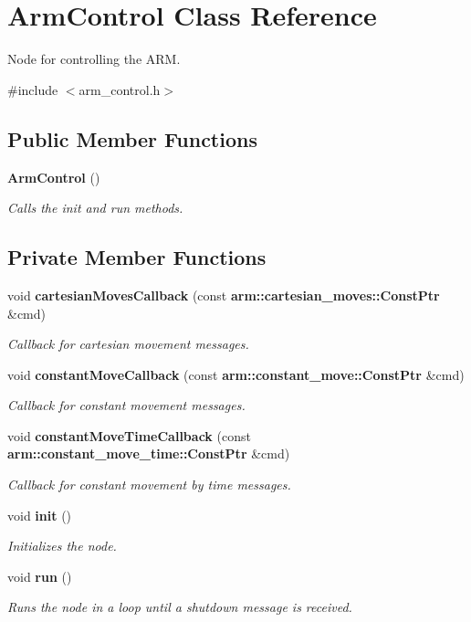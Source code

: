 \section{\-Arm\-Control \-Class \-Reference}
\label{classArmControl}


\-Node for controlling the \-A\-R\-M.  




{\ttfamily \#include $<$arm\-\_\-control.\-h$>$}

\subsection*{\-Public \-Member \-Functions}
\begin{DoxyCompactItemize}
\item 
{\bf \-Arm\-Control} ()
\begin{DoxyCompactList}\small\item\em \-Calls the init and run methods. \end{DoxyCompactList}\end{DoxyCompactItemize}
\subsection*{\-Private \-Member \-Functions}
\begin{DoxyCompactItemize}
\item 
void {\bf cartesian\-Moves\-Callback} (const {\bf arm\-::cartesian\-\_\-moves\-::\-Const\-Ptr} \&cmd)
\begin{DoxyCompactList}\small\item\em \-Callback for cartesian movement messages. \end{DoxyCompactList}\item 
void {\bf constant\-Move\-Callback} (const {\bf arm\-::constant\-\_\-move\-::\-Const\-Ptr} \&cmd)
\begin{DoxyCompactList}\small\item\em \-Callback for constant movement messages. \end{DoxyCompactList}\item 
void {\bf constant\-Move\-Time\-Callback} (const {\bf arm\-::constant\-\_\-move\-\_\-time\-::\-Const\-Ptr} \&cmd)
\begin{DoxyCompactList}\small\item\em \-Callback for constant movement by time messages. \end{DoxyCompactList}\item 
void {\bf init} ()
\begin{DoxyCompactList}\small\item\em \-Initializes the node. \end{DoxyCompactList}\item 
void {\bf run} ()
\begin{DoxyCompactList}\small\item\em \-Runs the node in a loop until a shutdown message is received. \end{DoxyCompactList}\end{DoxyCompactItemize}
